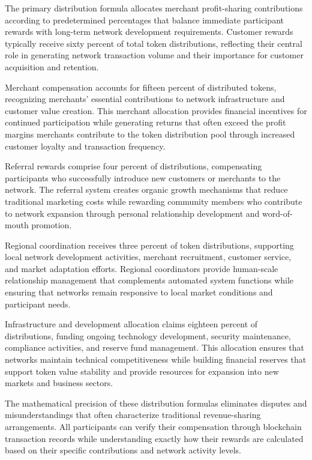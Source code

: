 \documentclass[
  Letterpaper,
]{scrbook}
\begin{document}
The primary distribution formula allocates merchant profit-sharing
contributions according to predetermined percentages that balance
immediate participant rewards with long-term network development
requirements. Customer rewards typically receive sixty percent of total
token distributions, reflecting their central role in generating network
transaction volume and their importance for customer acquisition and
retention.

Merchant compensation accounts for fifteen percent of distributed
tokens, recognizing merchants' essential contributions to network
infrastructure and customer value creation. This merchant allocation
provides financial incentives for continued participation while
generating returns that often exceed the profit margins merchants
contribute to the token distribution pool through increased customer
loyalty and transaction frequency.

Referral rewards comprise four percent of distributions, compensating
participants who successfully introduce new customers or merchants to
the network. The referral system creates organic growth mechanisms that
reduce traditional marketing costs while rewarding community members who
contribute to network expansion through personal relationship
development and word-of-mouth promotion.

Regional coordination receives three percent of token distributions,
supporting local network development activities, merchant recruitment,
customer service, and market adaptation efforts. Regional coordinators
provide human-scale relationship management that complements automated
system functions while ensuring that networks remain responsive to local
market conditions and participant needs.

Infrastructure and development allocation claims eighteen percent of
distributions, funding ongoing technology development, security
maintenance, compliance activities, and reserve fund management. This
allocation ensures that networks maintain technical competitiveness
while building financial reserves that support token value stability and
provide resources for expansion into new markets and business sectors.

The mathematical precision of these distribution formulas eliminates
disputes and misunderstandings that often characterize traditional
revenue-sharing arrangements. All participants can verify their
compensation through blockchain transaction records while understanding
exactly how their rewards are calculated based on their specific
contributions and network activity levels.
\end{document}
